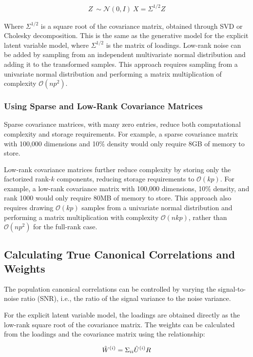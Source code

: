 \begin{align}
Z~\sim \mathcal{N}(0, I) \
X = \Sigma^{1/2}Z
\end{align}

Where \( \Sigma^{1/2} \) is a square root of the covariance matrix, obtained through SVD or Cholesky decomposition. This is the same as the generative model for the explicit latent variable model, where \( \Sigma^{1/2} \) is the matrix of loadings. Low-rank noise can be added by sampling from an independent multivariate normal distribution and adding it to the transformed samples. This approach requires sampling from a univariate normal distribution and performing a matrix multiplication of complexity \(\mathcal{O}(np^2)\).

\subsubsection{Using Sparse and Low-Rank Covariance Matrices}
Sparse covariance matrices, with many zero entries, reduce both computational complexity and storage requirements. For example, a sparse covariance matrix with 100,000 dimensions and 10\% density would only require 8GB of memory to store.

Low-rank covariance matrices further reduce complexity by storing only the factorized rank-$k$ components, reducing storage requirements to \(\mathcal{O}(kp)\). For example, a low-rank covariance matrix with 100,000 dimensions, 10\% density, and rank 1000 would only require 80MB of memory to store. This approach also requires drawing \(\mathcal{O}(kp)\) samples from a univariate normal distribution and performing a matrix multiplication with complexity \(\mathcal{O}(nkp)\), rather than \(\mathcal{O}(np^2)\) for the full-rank case.

\subsection{Calculating True Canonical Correlations and Weights}
The population canonical correlations can be controlled by varying the signal-to-noise ratio (SNR), i.e., the ratio of the signal variance to the noise variance.

For the explicit latent variable model, the loadings are obtained directly as the low-rank square root of the covariance matrix. The weights can be calculated from the loadings and the covariance matrix using the relationship:

\begin{align}
\hat{W}^{(i)} = \Sigma_{ii} \hat{U}^{(i)} R
\end{align}

